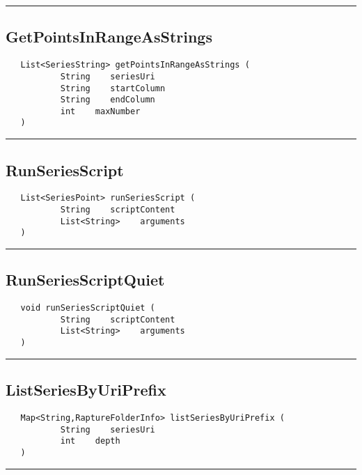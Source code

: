 \rule{15cm}{2pt}
\subsection{GetPointsInRangeAsStrings}
\label{Api:GetPointsInRangeAsStrings}
\begin{verbatim}
   List<SeriesString> getPointsInRangeAsStrings (
           String    seriesUri
           String    startColumn
           String    endColumn
           int    maxNumber
   )
\end{verbatim}



\rule{15cm}{2pt}
\subsection{RunSeriesScript}
\label{Api:RunSeriesScript}
\begin{verbatim}
   List<SeriesPoint> runSeriesScript (
           String    scriptContent
           List<String>    arguments
   )
\end{verbatim}



\rule{15cm}{2pt}
\subsection{RunSeriesScriptQuiet}
\label{Api:RunSeriesScriptQuiet}
\begin{verbatim}
   void runSeriesScriptQuiet (
           String    scriptContent
           List<String>    arguments
   )
\end{verbatim}



\rule{15cm}{2pt}
\subsection{ListSeriesByUriPrefix}
\label{Api:ListSeriesByUriPrefix}
\begin{verbatim}
   Map<String,RaptureFolderInfo> listSeriesByUriPrefix (
           String    seriesUri
           int    depth
   )
\end{verbatim}



\rule{15cm}{2pt}
